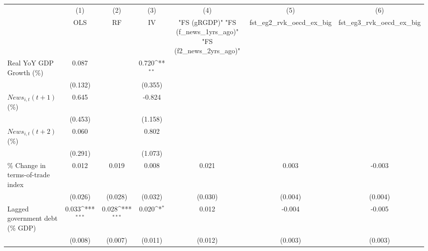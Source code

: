 {
\def\sym#1{\ifmmode^{#1}\else\(^{#1}\)\fi}
\begin{tabular}{l*{6}{c}}
\toprule
                    &\multicolumn{1}{c}{(1)}&\multicolumn{1}{c}{(2)}&\multicolumn{1}{c}{(3)}&\multicolumn{1}{c}{(4)}&\multicolumn{1}{c}{(5)}&\multicolumn{1}{c}{(6)}\\
                    &\multicolumn{1}{c}{OLS}&\multicolumn{1}{c}{RF}&\multicolumn{1}{c}{IV}&\multicolumn{1}{c}{ "FS (gRGDP)"  "FS (f_news_1yrs_ago)"  "FS (f2_news_2yrs_ago)" }&\multicolumn{1}{c}{fst_eg2_rvk_oecd_ex_big}&\multicolumn{1}{c}{fst_eg3_rvk_oecd_ex_big}\\
\midrule
Real YoY GDP Growth (\%)&       0.087         &                     &       0.720\sym{**} &                     &                     &                     \\
                    &     (0.132)         &                     &     (0.355)         &                     &                     &                     \\
\addlinespace
$ News_{i,t}(t+1)$ (\%)&       0.645         &                     &      -0.824         &                     &                     &                     \\
                    &     (0.453)         &                     &     (1.158)         &                     &                     &                     \\
\addlinespace
$ News_{i,t}(t+2)$ (\%)&       0.060         &                     &       0.802         &                     &                     &                     \\
                    &     (0.291)         &                     &     (1.073)         &                     &                     &                     \\
\addlinespace
\% Change in terms-of-trade index&       0.012         &       0.019         &       0.008         &       0.021         &       0.003         &      -0.003         \\
                    &     (0.026)         &     (0.028)         &     (0.032)         &     (0.030)         &     (0.004)         &     (0.004)         \\
\addlinespace
Lagged government debt (\% GDP)&       0.033\sym{***}&       0.028\sym{***}&       0.020\sym{*}  &       0.012         &      -0.004         &      -0.005         \\
                    &     (0.008)         &     (0.007)         &     (0.011)         &     (0.012)         &     (0.003)         &     (0.003)         \\

\end{tabular}}
